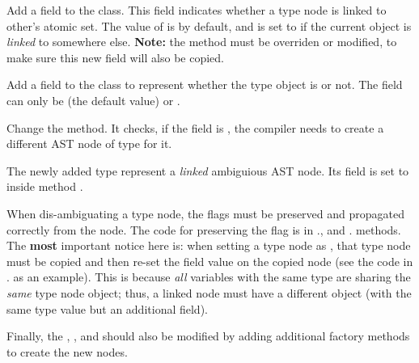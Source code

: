 \documentclass{article}
\begin{document}
\begin{enumerate}

\Item Add a  field to the  class. This field indicates whether a type node is linked to other's atomic set. The value of  is  by default, and is set to  if the current object is \textit{linked} to somewhere else. \textbf{Note:} the  method must be overriden or modified, to make sure this new  field will also be copied.

\Item Add a  field to the  class to represent whether the type object is  or not. The  field can only be  (the default value) or .

\Item Change the  method. It checks, if the  field is , the compiler needs to create a different AST node of type  for it.

\Item The newly added  type represent a \textit{linked} ambiguious AST node. Its  field is set to  inside method .

\Item When dis-ambiguating a type node, the  flags must be preserved and propagated correctly from the  node.  The code for preserving the  flag is in .,  and . methods. The \textbf{most} important notice here is: when setting a type node as ,  that type node must be copied and then re-set the field value on the copied node (see the code in . as an example). This is because \textit{all} variables with the same type are sharing the \textit{same} type node object; thus, a linked  node must have a different object (with the same type value but an additional  field).

\Item Finally, the , , and  should also be modified by adding additional factory methods to create the new  nodes.

\end{enumerate}
\end{document}
